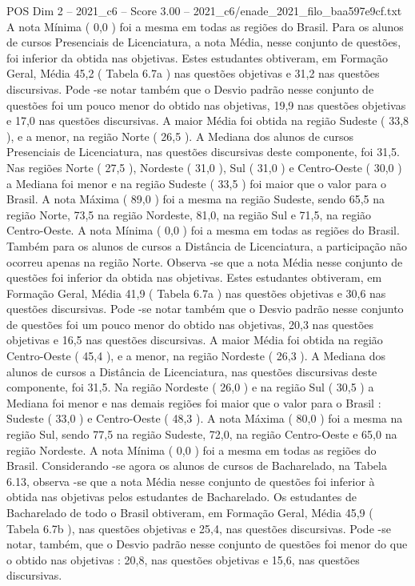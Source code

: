 \begin{textsample}{POS Dim 2 – 2021\_c6 – Score 3.00 – 2021\_c6/enade\_2021\_filo\_baa597e9cf.txt}
A nota Mínima ( 0,0 ) foi a mesma em todas as regiões do Brasil.
Para os alunos de cursos Presenciais de Licenciatura, a nota Média, nesse conjunto de questões, foi inferior da obtida nas objetivas.
Estes estudantes obtiveram, em Formação Geral, Média 45,2 ( Tabela 6.7a ) nas questões objetivas e 31,2 nas questões discursivas.
Pode -se notar também que o Desvio padrão nesse conjunto de questões foi um pouco menor do obtido nas objetivas, 19,9 nas questões objetivas e 17,0 nas questões discursivas.
A maior Média foi obtida na região Sudeste ( 33,8 ), e a menor, na região Norte ( 26,5 ).
A Mediana dos alunos de cursos Presenciais de Licenciatura, nas questões discursivas deste componente, foi 31,5.
Nas regiões Norte ( 27,5 ), Nordeste ( 31,0 ), Sul ( 31,0 ) e Centro-Oeste ( 30,0 ) a Mediana foi menor e na região Sudeste ( 33,5 ) foi maior que o valor para o Brasil.
A nota Máxima ( 89,0 ) foi a mesma na região Sudeste, sendo 65,5 na região Norte, 73,5 na região Nordeste, 81,0, na região Sul e 71,5, na região Centro-Oeste.
A nota Mínima ( 0,0 ) foi a mesma em todas as regiões do Brasil.
Também para os alunos de cursos a Distância de Licenciatura, a participação não ocorreu apenas na região Norte.
Observa -se que a nota Média nesse conjunto de questões foi inferior da obtida nas objetivas.
Estes estudantes obtiveram, em Formação Geral, Média 41,9 ( Tabela 6.7a ) nas questões objetivas e 30,6 nas questões discursivas.
Pode -se notar também que o Desvio padrão nesse conjunto de questões foi um pouco menor do obtido nas objetivas, 20,3 nas questões objetivas e 16,5 nas questões discursivas.
A maior Média foi obtida na região Centro-Oeste ( 45,4 ), e a menor, na região Nordeste ( 26,3 ).
A Mediana dos alunos de cursos a Distância de Licenciatura, nas questões discursivas deste componente, foi 31,5.
Na região Nordeste ( 26,0 ) e na região Sul ( 30,5 ) a Mediana foi menor e nas demais regiões foi maior que o valor para o Brasil : Sudeste ( 33,0 ) e Centro-Oeste ( 48,3 ).
A nota Máxima ( 80,0 ) foi a mesma na região Sul, sendo 77,5 na região Sudeste, 72,0, na região Centro-Oeste e 65,0 na região Nordeste.
A nota Mínima ( 0,0 ) foi a mesma em todas as regiões do Brasil.
Considerando -se agora os alunos de cursos de Bacharelado, na Tabela 6.13, observa -se que a nota Média nesse conjunto de questões foi inferior à obtida nas objetivas pelos estudantes de Bacharelado.
Os estudantes de Bacharelado de todo o Brasil obtiveram, em Formação Geral, Média 45,9 ( Tabela 6.7b ), nas questões objetivas e 25,4, nas questões discursivas.
Pode -se notar, também, que o Desvio padrão nesse conjunto de questões foi menor do que o obtido nas objetivas : 20,8, nas questões objetivas e 15,6, nas questões discursivas.

\end{textsample}
